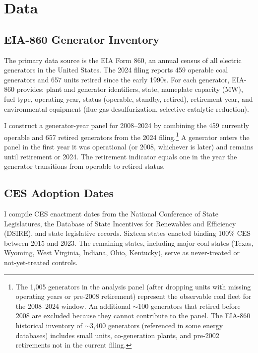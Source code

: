 \documentclass[12pt]{article}
\begin{document}
\section{Data}\label{sec:data}

\subsection{EIA-860 Generator Inventory}

The primary data source is the EIA Form 860, an annual census of all electric generators in the United States. The 2024 filing reports 459 operable coal generators and 657 units retired since the early 1990s. For each generator, EIA-860 provides: plant and generator identifiers, state, nameplate capacity (MW), fuel type, operating year, status (operable, standby, retired), retirement year, and environmental equipment (flue gas desulfurization, selective catalytic reduction).

I construct a generator-year panel for 2008--2024 by combining the 459 currently operable and 657 retired generators from the 2024 filing.\footnote{The 1,005 generators in the analysis panel (after dropping units with missing operating years or pre-2008 retirement) represent the observable coal fleet for the 2008--2024 window. An additional $\sim$100 generators that retired before 2008 are excluded because they cannot contribute to the panel. The EIA-860 historical inventory of $\sim$3,400 generators (referenced in some energy databases) includes small units, co-generation plants, and pre-2002 retirements not in the current filing.} A generator enters the panel in the first year it was operational (or 2008, whichever is later) and remains until retirement or 2024. The retirement indicator equals one in the year the generator transitions from operable to retired status.

\subsection{CES Adoption Dates}

I compile CES enactment dates from the National Conference of State Legislatures, the Database of State Incentives for Renewables and Efficiency (DSIRE), and state legislative records. Sixteen states enacted binding 100\% CES between 2015 and 2023. The remaining states, including major coal states (Texas, Wyoming, West Virginia, Indiana, Ohio, Kentucky), serve as never-treated or not-yet-treated controls.
\end{document}
